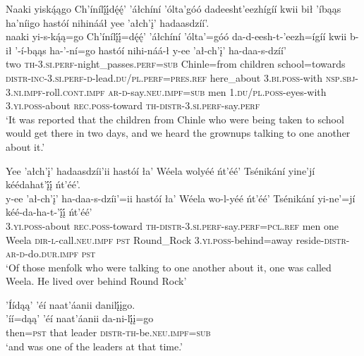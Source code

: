\ea\label{ex:text1-16-2}
Naaki yiską́ągo Ch’ínílį́į́dę́ę́’ ’áłchíní ’ólta’góó dadeesht’eezhígíí kwii bił ’íbąąs ha’níigo hastóí nihinááł yee ’ałch’į’ hadaasdzíí’.\\
\gll naaki	yi-s-ką́ą=go	Ch’ínílį́į́=dę́ę́’	’áłchíní	’ólta’=góó	da-d-eesh-t-’eezh=ígíí	kwii	b-ił	’-í-bąąs	ha-’-ní=go	hastóí	nihi-náá-ł	y-ee	’ał-ch’į’	ha-daa-s-dzíí’\\
     two	\textsc{th}-3.\textsc{si}.\textsc{perf}-night\_passes.\textsc{perf}=\textsc{sub}	Chinle=from	children	school=towards	\textsc{distr}-\textsc{inc}-3.\textsc{si}.\textsc{perf}-\textsc{d}-lead.\textsc{du}/\textsc{pl}.\textsc{perf}=\textsc{pres}.\textsc{ref}	here\_about	3.\textsc{bi}.\textsc{poss}-with	\textsc{nsp}.\textsc{sbj}-3.\textsc{ni}.\textsc{impf}-roll.\textsc{cont}.\textsc{impf}	\textsc{ar}-\textsc{d}-say.\textsc{neu}.\textsc{impf}=\textsc{sub}	men	1.\textsc{du}/\textsc{pl}.\textsc{poss}-eyes-with	3.\textsc{yi}.\textsc{poss}-about	\textsc{rec}.\textsc{poss}-toward	\textsc{th}-\textsc{distr}-3.\textsc{si}.\textsc{perf}-say.\textsc{perf}\\
\glt `It was reported that the children from Chinle who were being taken to school would get there in two days, and we heard the grownups talking to one another about it.'
\z

\ea\label{ex:text1-17-1}
Yee ’ałch’į’ hadaasdzíi’ii hastóí ła’ Wéela wolyéé ńt’éé’ Tsénikání yine’jí kéédahat’į́į́ ńt’éé’.\\
\gll y-ee	’ał-ch’į’	ha-daa-s-dzíi’=ii	hastóí	ła’	Wéela	wo-l-yéé	ńt’éé’	Tsénikání	yi-ne’=jí	kéé-da-ha-t-’į́į́ ńt’éé’\\
     3.\textsc{yi}.\textsc{poss}-about	\textsc{rec}.\textsc{poss}-toward	\textsc{th}-\textsc{distr}-3.\textsc{si}.\textsc{perf}-say.\textsc{perf}=\textsc{pcl}.\textsc{ref}	men	one	Weela	\textsc{dir}-\textsc{l}-call.\textsc{neu}.\textsc{impf}	\textsc{pst}	Round\_Rock	3.\textsc{yi}.\textsc{poss}-behind=away	reside-\textsc{distr}-\textsc{ar}-\textsc{d}-do.\textsc{dur}.\textsc{impf} \textsc{pst}\\
\glt `Of those menfolk who were talking to one another about it, one was called Weela. He lived over behind Round Rock'
\z

\ea\label{ex:text1-17-2}
’Íídąą’ ’éí naat’áanii danilį́įgo.\\
\gll ’íí=dąą’	’éí	naat’áanii	da-ni-lį́į=go\\
     then=\textsc{pst}	that	leader	\textsc{distr}-\textsc{th}-be.\textsc{neu}.\textsc{impf}=\textsc{sub}\\
\glt `and was one of the leaders at that time.'
\z

